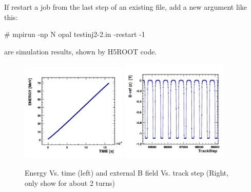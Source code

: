 If restart a job from the last step of an existing  file, add a new argument like this:
\begin{example}
 # mpirun -np N opal testinj2-2.in -restart -1
\end{example}
 are simulation results, shown by  H5ROOT code.

\begin{figure}[tb]
\centering
    \includegraphics[width=0.45\textwidth]{figures/cyclotron/Inj2-ENERGY-TIME.png}
    \includegraphics[width=0.45\textwidth]{figures/cyclotron/Inj2-B-ref-z-TrackStep.png}
    \caption{Energy Vs. time (left) and external B field Vs. track step (Right, only show for about 2 turns)}
    \label{fig:cyclParameters}
\end{figure}


